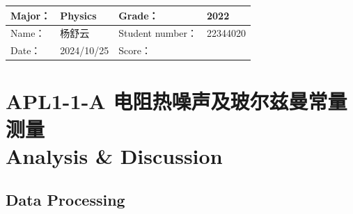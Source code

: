 
\begin{table}
	\renewcommand\arraystretch{1.7}
	\begin{tabularx}{\textwidth}{|X|X|X|X|}
		\hline
		Major：& Physics &Grade：& 2022\\
		\hline
		Name： & 杨舒云 & Student number：& 22344020 \\
		\hline
		Date：& 2024/10/25 & Score： &\\
		\hline
	\end{tabularx}
\end{table}
\section{APL1-1-A 电阻热噪声及玻尔兹曼常量测量 \\ Analysis \& Discussion}


\subsection{Data Processing}

